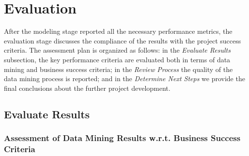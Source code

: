 \section{Evaluation}

After the modeling stage reported all the necessary performance metrics, the evaluation stage discusses the compliance of the results with the project success criteria. The assessment plan is organized as follows: in the \textit{Evaluate Results} subsection, the key performance criteria are evaluated both in terms of data mining and business success criteria; in the \textit{Review Process} the quality of the data mining process is reported; and in the \textit{Determine Next Steps} we provide the final conclusions about the further project development.

\subsection{Evaluate Results}

\subsubsection{Assessment of Data Mining Results w.r.t. Business Success Criteria}

